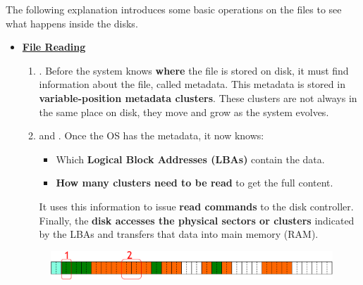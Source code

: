 \newpage

\noindent
The following explanation introduces some basic operations on the files to see what happens inside the disks.
\begin{itemize}
    \item \textcolor{Red2}{\underline{\textbf{File Reading}}}
    \begin{enumerate}
        \item {}. Before the system knows \textbf{where} the file is stored on disk, it must find information about the file, called metadata. This metadata is stored in \textbf{variable-position metadata clusters}. These clusters are not always in the same place on disk, they move and grow as the system evolves.
        \item {} and . Once the OS has the metadata, it now knows:
        \begin{itemize}
            \item Which \textbf{Logical Block Addresses (LBAs)} contain the data.
            \item \textbf{How many clusters need to be read} to get the full content.
        \end{itemize}
        It uses this information to issue \textbf{read commands} to the disk controller. Finally, the \textbf{disk accesses the physical sectors or clusters} indicated by the LBAs and transfers that data into main memory (RAM).
    \end{enumerate}
    \begin{figure}[!htp]
        \centering
        \includegraphics[width=.8\textwidth]{img/files-2.pdf}
    \end{figure}


\end{itemize}
